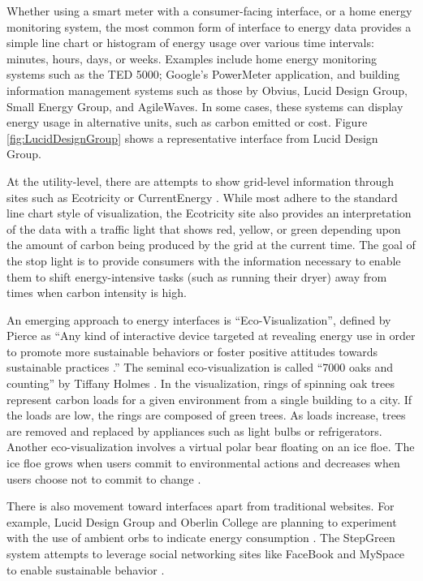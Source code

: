 Whether using a smart meter with a consumer-facing interface, or a home
energy monitoring system, the most common form of interface to energy data
provides a simple line chart or histogram of energy usage over various time
intervals: minutes, hours, days, or weeks.  Examples include home energy
monitoring systems such as the TED 5000; Google's PowerMeter application,
and building information management systems such as those by Obvius, Lucid
Design Group, Small Energy Group, and AgileWaves. In some cases, these
systems can display energy usage in alternative units, such as carbon
emitted or cost.  Figure \ref{fig:LucidDesignGroup} shows a representative
interface from Lucid Design Group.



At the utility-level, there are attempts to show grid-level information
through sites such as Ecotricity \cite{Ecotricity} or CurrentEnergy
\cite{CurrentEnergy}.  While most adhere to the standard line chart style
of visualization, the Ecotricity site also provides an interpretation of
the data with a  traffic light that shows red, yellow, or green depending upon
the amount of carbon being produced by the grid at the current time.  The
goal of the stop light is to provide consumers with the information
necessary to enable them to shift energy-intensive tasks (such as running
their dryer) away from times when carbon intensity is high.

An emerging approach to energy interfaces is ``Eco-Visualization'',
defined by Pierce as ``Any kind of interactive device targeted at
revealing energy use in order to promote more sustainable behaviors or
foster positive attitudes towards sustainable practices \cite{Pierce08}.''
The seminal eco-visualization is called ``7000 oaks and counting'' by
Tiffany Holmes \cite{Holmes07}.  In the visualization, rings of spinning
oak trees represent carbon loads for a given environment from a single
building to a city.  If the loads are low, the rings are composed of green
trees. As loads increase, trees are removed and replaced by appliances such
as light bulbs or refrigerators.  Another eco-visualization involves a
virtual polar bear floating on an ice floe. The ice floe grows when users
commit to environmental actions and decreases when users choose not to
commit to change \cite{Dillahunt08}.

There is also movement toward interfaces apart from traditional websites.
For example, Lucid Design Group and Oberlin College are planning to
experiment with the use of ambient orbs to indicate energy consumption
\cite{Peterson09}.  The StepGreen system attempts to leverage social
networking sites like FaceBook and MySpace to enable sustainable behavior
\cite{Mankoff07}.

